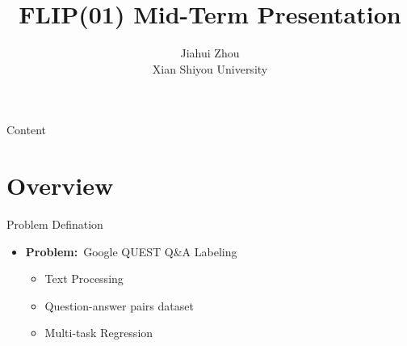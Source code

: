 \documentclass[
 size=12pt,
 paper=smartboard, %
 mode=present, %
 display=slides, %
style=tuliplab,
pauseslide,
fleqn,leqno]{powerdot}
\title{FLIP(01) Mid-Term Presentation}
\author{
Jiahui Zhou
\\
Xian Shiyou University 
}
\date{\gitCommitterDate}
\begin{document}
\maketitle 

\begin{slide}[toc=,bm=]{Content}
\tableofcontents[content=sections,type=1]
\end{slide}

\section{Overview}
\begin{slide}{Problem Defination}
    \begin{itemize}
        \item \textbf{Problem:}\ Google QUEST Q\&A Labeling
        \begin{itemize}
            \item Text Processing
            \item Question-answer pairs dataset
            \item Multi-task Regression
        \end{itemize}
    \end{itemize} 
\end{slide}
\end{document}
